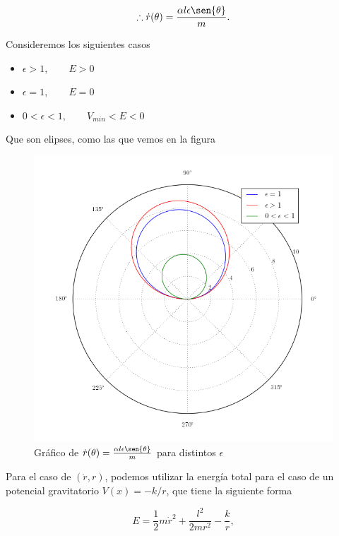 \documentclass[a4paper,10pt]{article}
\numberwithin{equation}{section}
\begin{document}
\begin{equation}
 \therefore \dot{r}(\theta) = \frac{\alpha l \epsilon \sen{\theta}}{m}.
\end{equation}

Consideremos los siguientes casos

\begin{itemize}
 \item $\epsilon > 1, \qquad E > 0$
 \item $\epsilon = 1, \qquad E = 0$
 \item $ 0 <\epsilon < 1, \qquad V_{min} < E < 0$ 
\end{itemize}

Que son elipses, como las que vemos en la figura 

\begin{figure}[H]
 \center 
 \includegraphics[scale=0.5]{problema5fig6}
 \caption{Gráfico de $\dot{r}(\theta) = \frac{\alpha l \epsilon \sen{\theta}}{m}$ 
 para distintos $\epsilon$}
 \label{fig:rDotTita}
\end{figure}

Para el caso de $(\dot{r},r)$, podemos utilizar la energía total para el caso
de un potencial gravitatorio $V(x) = - k/r$, que tiene la siguiente forma 

\begin{equation}
 E = \frac{1}{2} m\dot{r}^2 + \frac{l^2}{2mr^2} - \frac{k}{r},
\end{equation}
\end{document}

